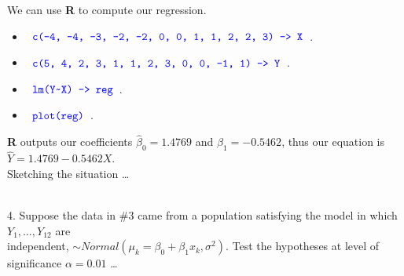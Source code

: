 \documentclass[12pt]{article}
\newcommand{\XB}{\color{black}}
\newcommand{\XBB}{\color{blue}}
\newcommand{\ds}{\displaystyle}
\begin{document}
\noindent
We can use \textbf{R} to compute our regression.

\begin{itemize}
    \item $ \ds {\XBB \texttt{ c(-4, -4, -3, -2, -2, 0, 0, 1, 1, 2, 2, 3) -> X }} $.
    \item $ \ds {\XBB \texttt{ c(5, 4, 2, 3, 1, 1, 2, 3, 0, 0, -1, 1) -> Y }} $.
    \item $ \ds {\XBB \texttt{ lm(Y} \verb|~| \texttt{X) -> reg }} $.
    \item $ \ds {\XBB \texttt{ plot(reg) }} $.
\end{itemize}

\noindent
\textbf{R} outputs our coefficients $ \hat{\beta}_{0} = 1.4769 $ and $ \hat{\beta}_{1} = -0.5462 $, thus our equation is $ \hat{Y} = 1.4769 - 0.5462X $. \\

\noindent
Sketching the situation \dots \\

\begin{center}
\end{center}

\vspace{2.5mm}

\newpage
\XBB\hrulefill\XB \\

4. Suppose the data in \#3 came from a population satisfying the model in which $ Y_{1}, \dots , Y_{12} $ are \\ independent,
$ \sim Normal(\mu_{k} = \beta_{0} + \beta_{1}x_{k}, \sigma^{2}) $. Test the hypotheses at level of significance $ \alpha = 0.01 $ \dots \\
\end{document}
